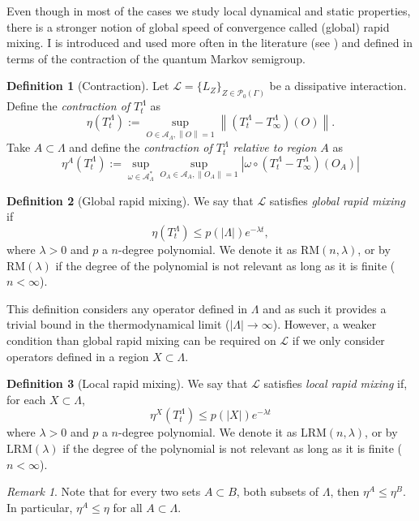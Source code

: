 \documentclass[11pt]{article}
\numberwithin{equation}{section}
\numberwithin{figure}{section}
\numberwithin{table}{section}
\theoremstyle{definition}
\newtheorem{mydef}{Definition}[section]
\theoremstyle{plain}
\theoremstyle{remark}
\newtheorem{obs}[thm]{Remark}
\newcommand{\w}{\omega}
\newcommand{\Li}{\mathcal{L}}
\newcommand{\A}{\mathcal{A}}
\newcommand{\La}{\Lambda}
\newcommand{\T}{T^\Lambda}
\newcommand{\norm}[1]{\left\lVert#1\right\rVert}
\newcommand{\abs}[1]{\left \vert#1\right\vert}
\begin{document}
Even though in most of the cases we study local dynamical and static properties, there is a stronger notion of global speed of convergence called (global) rapid mixing. I is introduced and used more often in the literature (see \cite{brandao_area_2015,cubitt_stability_2015}) and defined in terms of the contraction of the quantum Markov semigroup.
\medskip
\begin{mydef}[Contraction]\label{def:contraction}
    Let $\Li=\{L_Z\}_{Z\in \mathcal{P}_0(\Gamma)}$ be a dissipative interaction. Define the \textit{contraction of $\T_t$} as
    \begin{equation}
        \eta(\T_t):=\sup_{O\in \A_\La,\norm{O}=1} \norm{(\T_t-\T_\infty)(O)}.
    \end{equation}
    Take $A\subset \Lambda$ and define the \textit{contraction of $\T_t$ relative to region $A$} as
    \begin{equation}
        \eta^A(\T_t):=\sup_{\w \in \A_\La^*}\sup_{O_A\in \A_A,\norm{O_A}=1} \abs{\w \circ (\T_t-\T_\infty)(O_A)}
    \end{equation}
\end{mydef}
\begin{mydef}[Global rapid mixing]\label{def:globalRM}
    We say that $\Li$ satisfies  \textit{global rapid mixing} if 
    \begin{equation}
        \eta(\T_t)\leq p(\abs{\Lambda})e^{-\lambda t},
    \end{equation}
    where $\lambda >0$ and $p$ a $n$-degree polynomial. We denote it as $\text{RM}(n,\lambda)$, or by $\text{RM}(\lambda)$ if the degree of the polynomial is not relevant as long as it is finite ($n<\infty$).
\end{mydef}

This definition considers any operator defined in $\La$ and as such it provides a trivial bound in the thermodynamical limit ($\abs{\Lambda}\to\infty$). 
However, a weaker condition than global rapid mixing can be required on $\Li$ if we only consider operators defined in a region $X\subset \La$.
\medskip
\begin{mydef}[Local rapid mixing]\label{def:localRM}
    We say that $\Li$ satisfies \textit{local rapid mixing} if, for each $X\subset \Lambda$,
    \begin{equation}
        \eta^X(\T_t)\leq p(\abs{X}) e^{-\lambda t}
    \end{equation}
    where $\lambda >0$ and $p$ a $n$-degree polynomial. We denote it as $\text{LRM}(n,\lambda)$, or by $\text{LRM}(\lambda)$ if the degree of the polynomial is not relevant as long as it is finite ($n<\infty$).
    \medskip
\end{mydef}
\medskip
\begin{obs}
    Note that for every two sets $A\subset B$, both subsets of $\Lambda$, then $\eta^A\leq \eta ^B$. In particular, $\eta ^A\leq \eta$ for all $A\subset \Lambda$.
\end{obs}
\medskip
\end{document}
